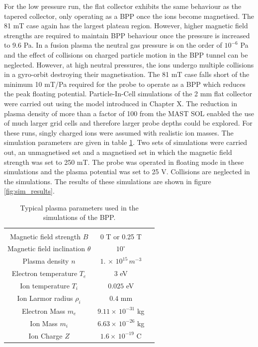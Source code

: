 For the low pressure run, the flat collector exhibits the same behaviour as the tapered collector, only operating as a BPP once the ions become magnetised. The 81 mT case again has the largest plateau region. However, higher magnetic field strengths are required to maintain BPP behaviour once the pressure is increased to 9.6 Pa. In a fusion plasma the neutral gas pressure is on the order of $10^{-6}$ Pa and the effect of collisions on charged particle motion in the BPP tunnel can be neglected. However, at high neutral pressures, the ions undergo multiple collisions in a gyro-orbit destroying their magnetisation. The 81 mT case falls short of the minimum 10 mT/Pa required for the probe to operate as a BPP \cite{low_T} which reduces the peak floating potential. 
Particle-In-Cell simulations of the 2 mm flat collector were carried out using the model introduced in Chapter X. The reduction in plasma density of more than a factor of 100 from the MAST SOL enabled the use of much larger grid cells and therefore larger probe depths could be explored. For these runs, singly charged ions were assumed with realistic ion masses. The simulation parameters are given in table \ref{tab:sim_parameters}. Two sets of simulations were carried out, an unmagnetised set and a magnetised set in which the magnetic field strength was set to 250 mT. The probe was operated in floating mode in these simulations and the plasma potential was set to 25 V. Collisions are neglected in the simulations. The results of these simulations are shown in figure \ref{fig:sim_results}.
\begin{table}[]
	\centering

	\begin{tabular}{c|c|c}  %
		 &  &  \\ %
		Magnetic field strength $B$             & 0 T or 0.25 T                                               \\
		Magnetic field inclination $\theta$                & $10^{\circ} $      \\
		Plasma density $n$               & $1.\, \times \, 10^{15} \, m^{-3}$ \\ 
		Electron temperature $T_e$ &      $ 3$ eV     \\ 
		Ion temperature  $T_i$ &     $0.025$ eV  \\  
		Ion Larmor radius $\rho_i$  &  $0.4$ mm  \\
		Electron Mass $m_e$ &  $9.11 \times \, 10^{-31}$ kg \\
		Ion Mass $m_i$ & $6.63 \times \, 10^{-26}$ kg   \\
		Ion Charge $Z$ & $1.6 \times \, 10^{-19}$ C \\
	\end{tabular} 
		\caption{Typical plasma parameters used in the simulations of the BPP. }
		\label{tab:sim_parameters}
\end{table}


